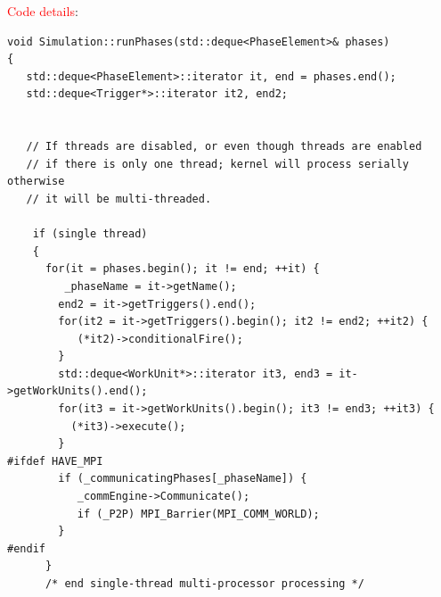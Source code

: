 \textcolor{red}{Code details}:
\begin{lstlisting}
void Simulation::runPhases(std::deque<PhaseElement>& phases)                                                  
{                                                                                                             
   std::deque<PhaseElement>::iterator it, end = phases.end();                                                 
   std::deque<Trigger*>::iterator it2, end2;                                                                  
                                                                                                              
                                                                                                              
   // If threads are disabled, or even though threads are enabled                                             
   // if there is only one thread; kernel will process serially otherwise                                                                                                                              
   // it will be multi-threaded.                                                           
   
    if (single thread)
    {
      for(it = phases.begin(); it != end; ++it) {                                                                                                                                                                    
         _phaseName = it->getName();                                                                          
        end2 = it->getTriggers().end();                                                                          
        for(it2 = it->getTriggers().begin(); it2 != end2; ++it2) {                                               
           (*it2)->conditionalFire();                                                                            
        }                                                                                                        
        std::deque<WorkUnit*>::iterator it3, end3 = it->getWorkUnits().end();                                    
        for(it3 = it->getWorkUnits().begin(); it3 != end3; ++it3) {                                              
          (*it3)->execute();                                                                                    
        }                                                                                                        
#ifdef HAVE_MPI                                                                                               
        if (_communicatingPhases[_phaseName]) {                                                                  
           _commEngine->Communicate();                                                                            
           if (_P2P) MPI_Barrier(MPI_COMM_WORLD);                                                                 
        }                                                                                                        
#endif                                                                                                        
      }                        
      /* end single-thread multi-processor processing */
      

\end{lstlisting}
